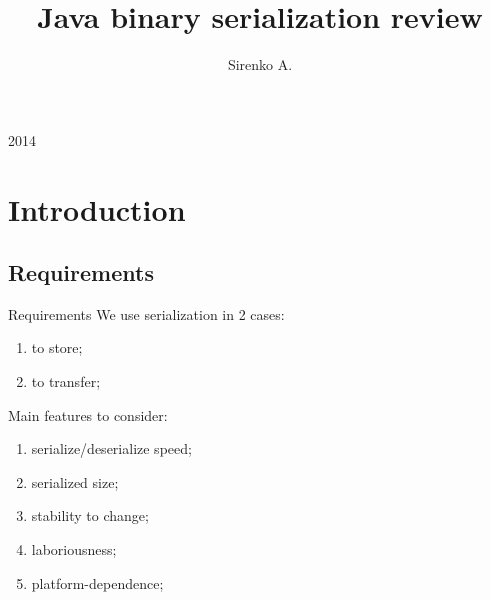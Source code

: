 \documentclass[8pt]{beamer}
\begin{document}
\title{Java binary serialization review}

\author{Sirenko A.}

\begin{frame}
\titlepage
\begin{center}
2014
\end{center}
\end{frame}

\section{Introduction}
\renewcommand{\partname}{Requirements}
\subsection{\partname}
\begin{frame}{\partname}
  We use serialization in 2 cases:
  \begin{enumerate}
    \item to store;
    \item to transfer;
  \end{enumerate}

  Main features to consider:
  \begin{enumerate}
    \item serialize/deserialize speed;
    \item serialized size;
    \item stability to change;
    \item laboriousness;
    \item platform-dependence;
  \end{enumerate}

\end{frame}

\renewcommand{\partname}{JDK tools}
\end{document}
